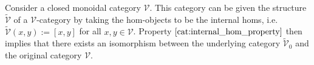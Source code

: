     \begin{property}
        Consider a closed monoidal category $\mathcal{V}$. This category can be given the structure $\widetilde{\mathcal{V}}$ of a $\mathcal{V}$-category by taking the hom-objects to be the internal homs, i.e.~$\widetilde{\mathcal{V}}(x,y) := [x,y]$ for all $x,y\in\mathcal{V}$. Property $\ref{cat:internal_hom_property}$ then implies that there exists an isomorphism between the underlying category $\widetilde{\mathcal{V}}_0$ and the original category $\mathcal{V}$.
    \end{property}


